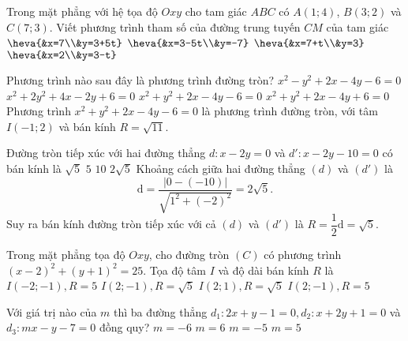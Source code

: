 \begin{ex}%
	Trong mặt phẳng với hệ tọa độ $Oxy$ cho tam giác $ABC$ có  $A(1;4)$, $B(3;2)$ và $C(7;3)$. Viết phương trình tham số của đường trung tuyến $CM$ của tam giác
	\choice
	{$\heva{&x=7\\&y=3+5t}$}
	{$\heva{&x=3-5t\\&y=-7}$}
	{\True $\heva{&x=7+t\\&y=3}$}
	{$\heva{&x=2\\&y=3-t}$}
\end{ex}
\begin{ex}%
	Phương trình nào sau đây là phương trình đường tròn?
	\choice
	{$x^2 - y^2 + 2x - 4y - 6 = 0$}
	{$x^2 + 2y^2 + 4x - 2y + 6 = 0$}
	{\True $x^2 + y^2 + 2x - 4y - 6 = 0$}
	{$x^2 + y^2 + 2x - 4y + 6 = 0$}
	\loigiai
	{
		Phương trình $x^2 + y^2 + 2x - 4y - 6 = 0$ là phương trình đường tròn, với tâm $I(-1;2)$ và bán kính $R = \sqrt{11}$.
	}
\end{ex}
\begin{ex}%
	Đường tròn tiếp xúc với hai đường thẳng $d \colon x - 2y = 0$ và $d'\colon x-2y - 10 = 0$ có bán kính là
	\choice
	{\True $\sqrt{5}$}
	{$5$}
	{$10$}
	{$2\sqrt{5}$}
	\loigiai
	{
		Khoảng cách giữa hai đường thẳng $(d)$ và $\left(d'\right)$ là \[\mathrm{d} = \dfrac{|0-(-10)|}{\sqrt{1^2 + (-2)^2}} = 2\sqrt{5}.\]
		Suy ra bán kính đường tròn tiếp xúc với cả $(d)$ và $\left(d'\right)$ là $R = \dfrac{1}{2}\mathrm{d} = \sqrt{5}$.
	}
\end{ex}
	\begin{ex}%
	Trong mặt phẳng tọa độ $Oxy$, cho đường tròn $(C)$ có phương trình $(x-2)^2+(y+1)^2=25$. Tọa độ tâm $I$ và độ dài bán kính $R$ là
	\choice
	{$I(-2; -1), R=5$}
	{$I(2; -1), R=\sqrt{5}$}
	{$I(2; 1), R=\sqrt 5$}
	{\True $I(2; -1), R=5$}
\end{ex}
\begin{ex}%
	Với giá trị nào của $m$ thì ba đường thẳng $d_{1} \colon 2x+y-1=0, d_{2} \colon x+2y+1=0$ và $d_{3} \colon mx-y-7=0$ đồng quy?
	\choice
	{$m=-6$}
	{\True $m=6$}
	{$m=-5$}
	{$m=5$}
\end{ex}
